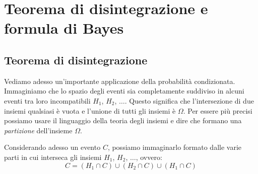 \section{Teorema di disintegrazione e formula di Bayes}
\label{sec:05_bayes}
\subsection{Teorema di disintegrazione}
Vediamo adesso un'importante applicazione della probabilità condizionata. 
Immaginiamo che lo spazio degli eventi sia completamente suddiviso in alcuni 
eventi tra loro incompatibili $H_1$, $H_2$, $\dots$. Questo significa che 
l'intersezione di due insiemi qualsiasi è vuota e l'unione di tutti gli insiemi 
è $\Omega$. Per essere più precisi possiamo usare il linguaggio della teoria 
degli insiemi e dire che formano una \emph{partizione} dell'insieme $\Omega$. 

Considerando adesso un evento $C$, possiamo immaginarlo formato dalle varie 
parti in cui interseca gli insiemi $H_1$, $H_2$, $\dots$, ovvero:
$$ C = (H_1 \cap C) \cup (H_2 \cap C) \cup (H_1 \cap C)$$
\begin{inaccessibleblock}
 \begin{figure}[htpb]
\begin{minipage}[c]{.45\textwidth}
\end{minipage}\hfil
\begin{minipage}[c]{.45\textwidth}
\end{minipage}
\end{figure}
\end{inaccessibleblock}

